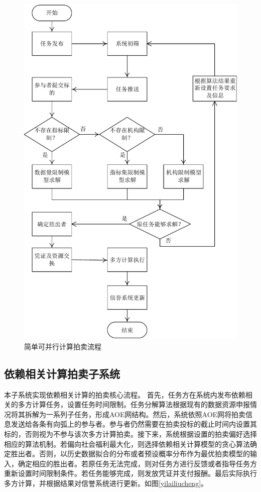 \documentclass[promaster]{thesis-uestc}
\begin{document}
\begin{figure}[p]
    \includegraphics{pic/kebingxing.pdf}
    \caption{简单可并行计算拍卖流程}
    \label{jiandanliucheng}
\end{figure}

\subsection{依赖相关计算拍卖子系统}

本子系统实现依赖相关计算的拍卖核心流程。
首先，任务方在系统内发布依赖相关的多方计算任务，设置任务时间限制。任务分解算法根据现有的数据资源申报情况将其拆解为一系列子任务，形成AOE网结构。然后，系统依照AOE网将拍卖信息发送给各条有向弧上的参与者。参与者仍然需要在拍卖投标的截止时间内设置其标的，否则视为不参与该次多方计算拍卖。接下来，系统根据设置的拍卖偏好选择相应的算法机制。若偏向社会福利最大化，则选择依赖相关计算模型的贪心算法确定胜出者。否则，以历史数据拟合的分布或者预设概率分布作为最优拍卖模型的输入，确定相应的胜出者。若原任务无法完成，则对任务方进行反馈或者指导任务方重新设置时间限制条件。若任务能够完成，则发放凭证并支付报酬。最后实际执行多方计算，并根据结果对信誉系统进行更新。如图\ref{yilailiucheng}。
\end{document}
